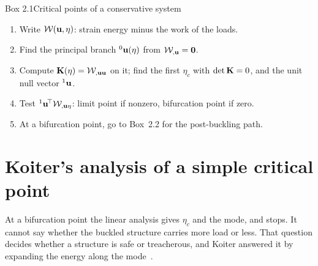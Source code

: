 \begin{gbox}{Box 2.1\quad Critical points of a conservative system}\label{sec:ld-box-crit}
%
\begin{enumerate}
  \item Write $\mathcal{W}(\mathbf{u},\eta)$: strain energy minus the work of the loads.
  \item Find the principal branch ${}^0\mathbf{u}(\eta)$ from $\mathcal{W}_{,\mathbf{u}} = \mathbf{0}$.
  \item Compute $\mathbf{K}(\eta) = \mathcal{W}_{,\mathbf{u}\mathbf{u}}$ on it; find the first $\eta_c$
        with $\det\mathbf{K} = 0$, and the unit null vector ${}^1\mathbf{u}$.
  \item Test ${}^1\mathbf{u}^{\!\top}\mathcal{W}_{,\mathbf{u}\eta}$: limit point if nonzero, bifurcation
        point if zero.
  \item At a bifurcation point, go to Box~2.2 for the post-buckling path.
\end{enumerate}
\end{gbox}

\section{Koiter's analysis of a simple critical point}\label{sec:ld-koiter}
%

At a bifurcation point the linear analysis gives $\eta_c$ and the mode, and stops.
It cannot say whether the buckled structure carries more load or less. That
question decides whether a structure is safe or treacherous, and Koiter answered it
by expanding the energy along the mode~\cite{ld-koiter1945}.

